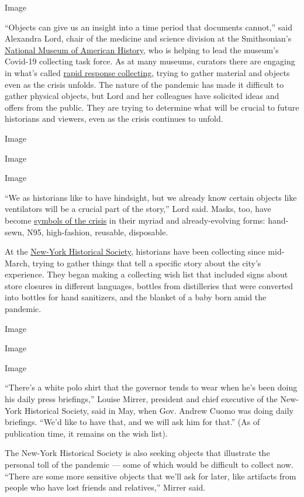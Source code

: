 Image

``Objects can give us an insight into a time period that documents
cannot,'' said Alexandra Lord, chair of the medicine and science
division at the Smithsonian's
\href{https://americanhistory.si.edu}{National Museum of American
History}, who is helping to lead the museum's Covid-19 collecting task
force. As at many museums, curators there are engaging in what's called
\href{https://www.nytimes3xbfgragh.onion/2020/07/14/style/museums-coronavirus-protests-2020.html}{rapid
response collecting}, trying to gather material and objects even as the
crisis unfolds. The nature of the pandemic has made it difficult to
gather physical objects, but Lord and her colleagues have solicited
ideas and offers from the public. They are trying to determine what will
be crucial to future historians and viewers, even as the crisis
continues to unfold.

Image

Image

Image

``We as historians like to have hindsight, but we already know certain
objects like ventilators will be a crucial part of the story,'' Lord
said. Masks, too, have become
\href{https://www.nytimes3xbfgragh.onion/2020/05/15/style/the-hidden-language-of-masks-smithsonian.html}{symbols
of the crisis} in their myriad and already-evolving forms: hand-sewn,
N95, high-fashion, reusable, disposable.

At the \href{https://www.nyhistory.org}{New-York Historical Society},
historians have been collecting since mid-March, trying to gather things
that tell a specific story about the city's experience. They began
making a collecting wish list that included signs about store closures
in different languages, bottles from distilleries that were converted
into bottles for hand sanitizers, and the blanket of a baby born amid
the pandemic.

Image

Image

Image

``There's a white polo shirt that the governor tends to wear when he's
been doing his daily press briefings,'' Louise Mirrer, president and
chief executive of the New-York Historical Society, said in May, when
Gov. Andrew Cuomo was doing daily briefings. ``We'd like to have that,
and we will ask him for that.'' (As of publication time, it remains on
the wish list).

The New-York Historical Society is also seeking objects that illustrate
the personal toll of the pandemic --- some of which would be difficult
to collect now. ``There are some more sensitive objects that we'll ask
for later, like artifacts from people who have lost friends and
relatives,'' Mirrer said.

